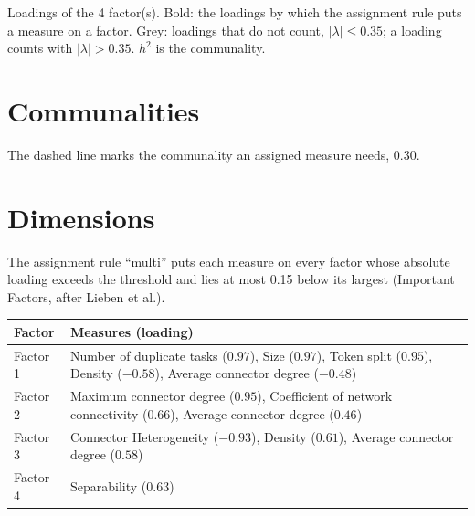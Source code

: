 \documentclass[a4paper]{article}
\begin{document}
\noindent
Loadings of the 4 factor(s). Bold: the loadings by which the assignment rule puts a measure on a factor. Grey: loadings that do not count, $|\lambda| \leq 0.35$; a loading counts with $|\lambda| > 0.35$. $h^2$ is the communality.

\section*{Communalities}
\begin{center}
\end{center}
The dashed line marks the communality an assigned measure needs, $0.30$.

\section*{Dimensions}
\noindent
The assignment rule ``multi'' puts each measure on every factor whose absolute loading exceeds the threshold and lies at most 0.15 below its largest (Important Factors, after Lieben et al.).

\begin{longtable}{@{}>{\raggedright\arraybackslash}p{4.5cm}>{\raggedright\arraybackslash}p{11cm}@{}}
\toprule
Factor & Measures (loading) \\
\midrule
\endhead
\bottomrule
\endfoot
Factor 1 & Number of duplicate tasks ($0.97$), Size ($0.97$), Token split ($0.95$), Density ($-0.58$), Average connector degree ($-0.48$) \\
Factor 2 & Maximum connector degree ($0.95$), Coefficient of network connectivity ($0.66$), Average connector degree ($0.46$) \\
Factor 3 & Connector Heterogeneity ($-0.93$), Density ($0.61$), Average connector degree ($0.58$) \\
Factor 4 & Separability ($0.63$) \\
\end{longtable}
\end{document}
